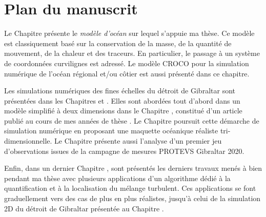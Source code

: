 \section{Plan du manuscrit}

Le Chapitre  présente le \textit{modèle d'océan} sur lequel s'appuie ma thèse. Ce modèle est classiquement basé sur la conservation de la masse, de la quantité de mouvement, de la chaleur et des traceurs. En particulier, le passage à un système de coordonnées curvilignes est adressé. Le modèle  CROCO pour la simulation numérique de l'océan régional et/ou côtier est aussi présenté dans ce chapitre.

Les simulations numériques des fines échelles du détroit de Gibraltar sont présentées dans les Chapitres  et . Elles sont abordées tout d'abord dans un modèle simplifié à deux dimensions dans le Chapitre , constitué d'un article publié au cours de mes années de thèse \citep{hilt_2020}. Le Chapitre  poursuit cette démarche de simulation numérique en proposant une maquette océanique réaliste tri-dimensionnelle. Le Chapitre  présente aussi l'analyse d'un premier jeu d'observations issues de la campagne de mesures PROTEVS Gibraltar 2020.

Enfin, dans un dernier Chapitre , sont présentés les derniers travaux menés à bien pendant ma thèse avec plusieurs applications d'un algorithme dédié à la quantification et à la localisation du mélange turbulent. Ces applications se font graduellement vers des cas de plus en plus réalistes, jusqu'à celui de la simulation 2D du détroit de Gibraltar présentée au Chapitre .



